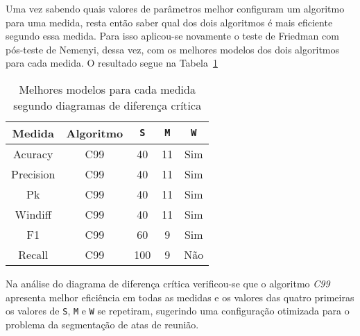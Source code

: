 Uma vez sabendo quais valores de parâmetros melhor configuram um algoritmo para uma medida, resta então saber qual dos dois algoritmos é mais eficiente segundo essa medida. Para isso aplicou-se novamente o teste de Friedman com pós-teste de Nemenyi, dessa vez, com os melhores modelos dos dois algoritmos para cada medida. O resultado segue na Tabela~\ref{tab:melhoresmodelos}

\begin{table}[!h]
	\centering
	
	\begin{tabular}{|c|c|c|c|c|}

		\hline
		Medida & Algoritmo & \texttt{S} & \texttt{M} & \texttt{W}\\		
		\hline
		
	
		Acuracy		& C99 & 40 	& 11	& Sim \\ \hline
		Precision	& C99 & 40 	& 11	& Sim \\ \hline
		Pk			& C99 & 40 	& 11	& Sim \\ \hline
		Windiff		& C99 & 40 	& 11	& Sim \\ \hline
		F1			& C99 & 60 	& 9		& Sim \\ \hline
		Recall		& C99 & 100 & 9		& Não \\ \hline
 	
	
	\end{tabular}

	\caption{Melhores modelos para cada medida segundo diagramas de diferença crítica}
	\label{tab:melhoresmodelos}	
	
\end{table}


Na análise do diagrama de diferença crítica verificou-se que o algoritmo \textit{C99} apresenta melhor eficiência em todas as medidas e os valores das quatro primeiras os valores de \texttt{S}, \texttt{M} e \texttt{W} se repetiram, sugerindo uma configuração otimizada para o problema da segmentação de atas de reunião.





